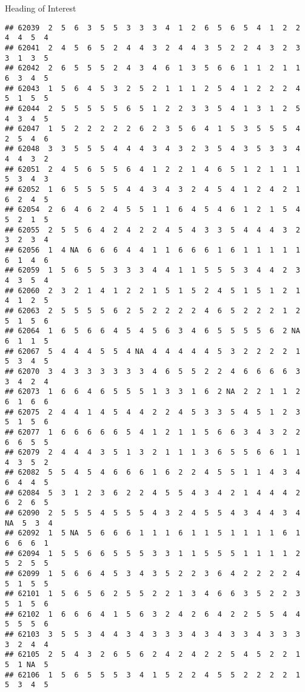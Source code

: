 \documentclass[
  ignorenonframetext,
]{beamer}
\begin{document}
\begin{frame}[fragile]{Heading of Interest}
\begin{verbatim}
## 62039  2  5  6  3  5  5  3  3  3  4  1  2  6  5  6  5  4  1  2  2  4  4  5  4
## 62041  2  4  5  6  5  2  4  4  3  2  4  4  3  5  2  2  4  3  2  3  3  1  3  5
## 62042  2  6  5  5  5  2  4  3  4  6  1  3  5  6  6  1  1  2  1  1  6  3  4  5
## 62043  1  5  6  4  5  3  2  5  2  1  1  1  2  5  4  1  2  2  2  4  5  1  5  5
## 62044  2  5  5  5  5  5  6  5  1  2  2  3  3  5  4  1  3  1  2  5  4  3  4  5
## 62047  1  5  2  2  2  2  2  6  2  3  5  6  4  1  5  3  5  5  5  4  2  5  4  6
## 62048  3  3  5  5  5  4  4  4  3  4  3  2  3  5  4  3  5  3  3  4  4  4  3  2
## 62051  2  4  5  6  5  5  6  4  1  2  2  1  4  6  5  1  2  1  1  1  5  3  4  3
## 62052  1  6  5  5  5  5  4  4  3  4  3  2  4  5  4  1  2  4  2  1  6  2  4  5
## 62054  2  6  4  6  2  4  5  5  1  1  6  4  5  4  6  1  2  1  5  4  5  2  1  5
## 62055  2  5  5  6  4  2  4  2  2  4  5  4  3  3  5  4  4  4  3  2  3  2  3  4
## 62056  1  4 NA  6  6  6  4  4  1  1  6  6  6  1  6  1  1  1  1  1  6  1  4  6
## 62059  1  5  6  5  5  3  3  3  4  4  1  1  5  5  5  3  4  4  2  3  4  3  5  4
## 62060  2  3  2  1  4  1  2  2  1  5  1  5  2  4  5  1  5  1  2  1  4  1  2  5
## 62063  2  5  5  5  5  6  2  5  2  2  2  2  4  6  5  2  2  2  1  2  5  1  5  6
## 62064  1  6  5  6  6  4  5  4  5  6  3  4  6  5  5  5  5  6  2 NA  6  1  1  5
## 62067  5  4  4  4  5  5  4 NA  4  4  4  4  4  5  3  2  2  2  2  1  5  3  4  5
## 62070  3  4  3  3  3  3  3  3  4  6  5  5  2  2  4  6  6  6  6  3  3  4  2  4
## 62073  1  6  6  4  6  5  5  5  1  3  3  1  6  2 NA  2  2  1  1  2  6  1  6  6
## 62075  2  4  4  1  4  5  4  4  2  2  4  5  3  3  5  4  5  1  2  3  5  1  5  6
## 62077  1  6  6  6  6  6  5  4  1  2  1  1  5  6  6  3  4  3  2  2  6  6  5  5
## 62079  2  4  4  4  3  5  1  3  2  1  1  1  3  6  5  5  6  6  1  1  4  3  5  2
## 62082  5  5  4  5  4  6  6  6  1  6  2  2  4  5  5  1  1  4  3  4  6  4  4  5
## 62084  5  3  1  2  3  6  2  2  4  5  5  4  3  4  2  1  4  4  4  2  6  2  6  5
## 62090  2  5  5  5  4  5  5  5  4  3  2  4  5  5  4  3  4  4  3  4 NA  5  3  4
## 62092  1  5 NA  5  6  6  6  1  1  1  6  1  1  5  1  1  1  1  6  1  6  6  6  1
## 62094  1  5  5  6  6  5  5  5  3  3  1  1  5  5  5  1  1  1  1  2  5  2  5  5
## 62099  1  5  6  6  4  5  3  4  3  5  2  2  3  6  4  2  2  2  2  4  5  1  5  5
## 62101  1  5  6  5  6  2  5  5  2  2  1  3  4  6  6  3  5  2  2  3  5  1  5  6
## 62102  1  6  6  6  4  1  5  6  3  2  4  2  6  4  2  2  5  5  4  4  5  5  5  6
## 62103  3  5  5  3  4  4  3  4  3  3  3  4  3  4  3  3  4  3  3  3  3  2  4  4
## 62105  2  5  4  3  2  6  5  6  2  4  2  4  2  2  5  4  5  2  2  1  5  1 NA  5
## 62106  1  5  6  5  5  5  3  4  1  5  2  2  4  5  5  2  2  2  2  1  5  3  4  5

\end{verbatim}
\end{frame}
\end{document}
